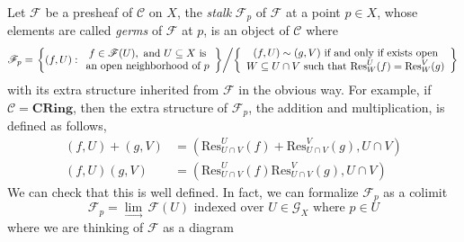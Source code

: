 \documentclass[11pt]{book}
\begin{document}
\begin{definition}Let $\mathscr{F}$ be a presheaf of $\mathcal C$ on $X$, the \textit{stalk} $\mathscr{F}_p$ of $\mathscr{F}$ at a point $p\in X$, whose elements are called \textit{germs} of $\mathscr{F}$ at $p$, is an object of $\mathcal C$ where
\[\mathscr{F}_p=\left.\left\{(f,U):\begin{array}{c}f\in\mathscr{F}(U),\textrm{\ and\ }U\subseteq X\textrm{\ is}\\\textrm{an\ open\ neighborhood\ of\ }p\end{array}\right\} \middle/ \left\{\begin{array}{c}(f,U)\sim (g,V)\textrm{\ if\ and\ only\ if\ exists\ open}\\W\subseteq U\cap V\textrm{\ such\ that\ }\mathrm{Res}^U_W(f)=\mathrm{Res}^V_W(g)\end{array}\right\}\right.\]
with its extra structure inherited from $\mathscr{F}$ in the obvious way. For example, if $\mathcal C=\mathbf{CRing}$, then the extra structure of $\mathscr{F}_p$, the addition and multiplication, is defined as follows,
\[\begin{aligned} (f,U)+(g,V)&=(\mathrm{Res}^U_{U\cap V}(f)+\mathrm{Res}^V_{U\cap V}(g),U\cap V)\\ (f,U)(g,V)&=(\mathrm{Res}^U_{U\cap V}(f)\mathrm{Res}^V_{U\cap V}(g),U\cap V)\end{aligned}\]
We can check that this is well defined. In fact, we can formalize $\mathscr{F}_p$ as a colimit
\[\mathscr{F}_p=\lim_{\longrightarrow}\,\mathscr{F}(U)\textrm{\ indexed\ over\ }U\in\mathcal G_X\textrm{\ where\ }p\in U\]
where we are thinking of $\mathscr{F}$ as a diagram 
\end{definition}
\end{document}
